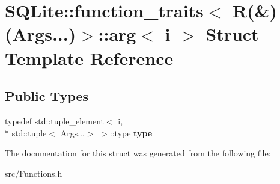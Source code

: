 \hypertarget{struct_s_q_lite_1_1function__traits_3_01_r_07_6_08_07_args_8_8_8_08_4_1_1arg}{\section{S\-Q\-Lite\-:\-:function\-\_\-traits$<$ R(\&)(Args...)$>$\-:\-:arg$<$ i $>$ Struct Template Reference}
\label{struct_s_q_lite_1_1function__traits_3_01_r_07_6_08_07_args_8_8_8_08_4_1_1arg}
}
\subsection*{Public Types}
\begin{DoxyCompactItemize}
\item 
\hypertarget{struct_s_q_lite_1_1function__traits_3_01_r_07_6_08_07_args_8_8_8_08_4_1_1arg_aa2ed486a23fd9ee59fd508ea5f5fdfb7}{typedef std\-::tuple\-\_\-element$<$ i, \\*
std\-::tuple$<$ Args...$>$ $>$\-::type {\bfseries type}}\label{struct_s_q_lite_1_1function__traits_3_01_r_07_6_08_07_args_8_8_8_08_4_1_1arg_aa2ed486a23fd9ee59fd508ea5f5fdfb7}

\end{DoxyCompactItemize}


The documentation for this struct was generated from the following file\-:\begin{DoxyCompactItemize}
\item 
src/Functions.\-h\end{DoxyCompactItemize}
